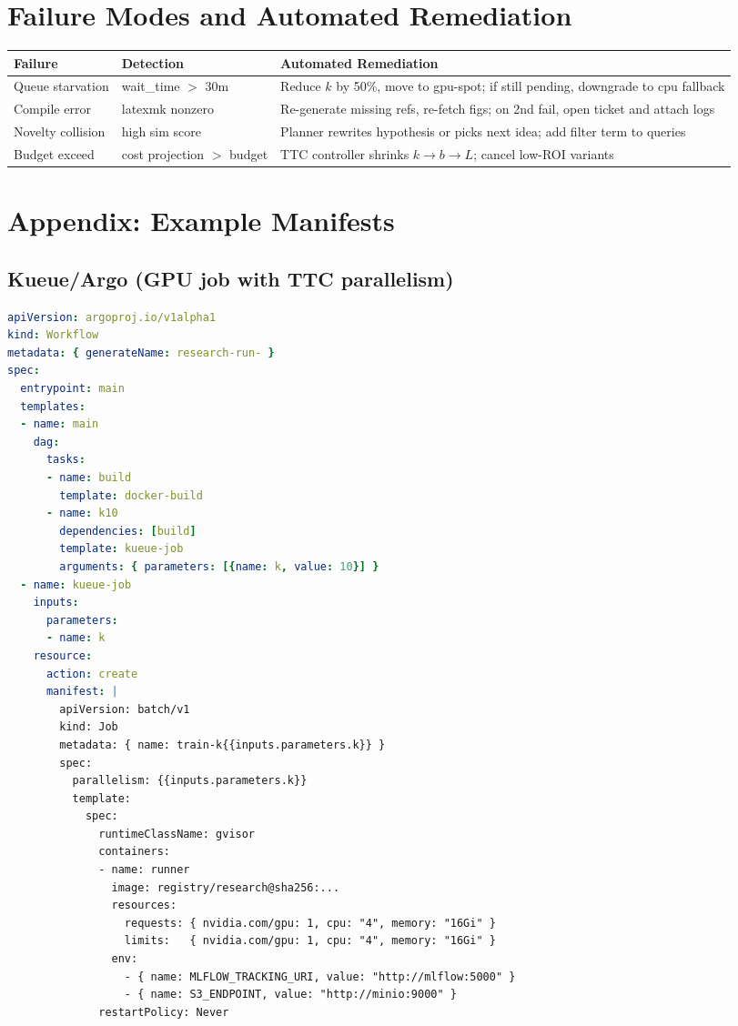 \section{Failure Modes and Automated Remediation}
\begin{tabular}{@{}p{3.7cm}p{6.8cm}p{4.6cm}@{}}
\toprule
Failure & Detection & Automated Remediation \\\midrule
Queue starvation & wait\_time $>$ 30m & Reduce $k$ by 50\%, move to gpu-spot; if still pending, downgrade to cpu fallback \\
Compile error & latexmk nonzero & Re-generate missing refs, re-fetch figs; on 2nd fail, open ticket and attach logs \\
Novelty collision & high sim score & Planner rewrites hypothesis or picks next idea; add filter term to queries \\
Budget exceed & cost projection $>$ budget & TTC controller shrinks $k\rightarrow b\rightarrow L$; cancel low-ROI variants \\
\bottomrule
\end{tabular}

\section{Appendix: Example Manifests}
\subsection*{Kueue/Argo (GPU job with TTC parallelism)}
\begin{lstlisting}[style=code,language=yaml]
apiVersion: argoproj.io/v1alpha1
kind: Workflow
metadata: { generateName: research-run- }
spec:
  entrypoint: main
  templates:
  - name: main
    dag:
      tasks:
      - name: build
        template: docker-build
      - name: k10
        dependencies: [build]
        template: kueue-job
        arguments: { parameters: [{name: k, value: 10}] }
  - name: kueue-job
    inputs:
      parameters:
      - name: k
    resource:
      action: create
      manifest: |
        apiVersion: batch/v1
        kind: Job
        metadata: { name: train-k{{inputs.parameters.k}} }
        spec:
          parallelism: {{inputs.parameters.k}}
          template:
            spec:
              runtimeClassName: gvisor
              containers:
              - name: runner
                image: registry/research@sha256:...
                resources:
                  requests: { nvidia.com/gpu: 1, cpu: "4", memory: "16Gi" }
                  limits:   { nvidia.com/gpu: 1, cpu: "4", memory: "16Gi" }
                env:
                  - { name: MLFLOW_TRACKING_URI, value: "http://mlflow:5000" }
                  - { name: S3_ENDPOINT, value: "http://minio:9000" }
              restartPolicy: Never
\end{lstlisting}




